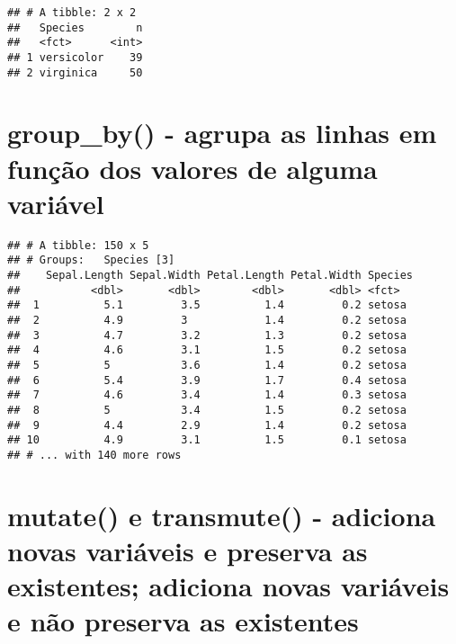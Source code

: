 \documentclass[]{book}
\newenvironment{Shaded}{\begin{snugshade}}{\end{snugshade}}
\newcommand{\CommentTok}[1]{\textcolor[rgb]{0.56,0.35,0.01}{\textit{#1}}}
\newcommand{\KeywordTok}[1]{\textcolor[rgb]{0.13,0.29,0.53}{\textbf{#1}}}
\newcommand{\NormalTok}[1]{#1}
\newcommand{\OperatorTok}[1]{\textcolor[rgb]{0.81,0.36,0.00}{\textbf{#1}}}
\newcommand{\StringTok}[1]{\textcolor[rgb]{0.31,0.60,0.02}{#1}}
\begin{document}
\begin{verbatim}
## # A tibble: 2 x 2
##   Species        n
##   <fct>      <int>
## 1 versicolor    39
## 2 virginica     50
\end{verbatim}

\hypertarget{group_by---agrupa-as-linhas-em-funuxe7uxe3o-dos-valores-de-alguma-variuxe1vel}{%
\section{group\_by() - agrupa as linhas em função dos valores de alguma variável}\label{group_by---agrupa-as-linhas-em-funuxe7uxe3o-dos-valores-de-alguma-variuxe1vel}}

\begin{Shaded}
\end{Shaded}

\begin{verbatim}
## # A tibble: 150 x 5
## # Groups:   Species [3]
##    Sepal.Length Sepal.Width Petal.Length Petal.Width Species
##           <dbl>       <dbl>        <dbl>       <dbl> <fct>  
##  1          5.1         3.5          1.4         0.2 setosa 
##  2          4.9         3            1.4         0.2 setosa 
##  3          4.7         3.2          1.3         0.2 setosa 
##  4          4.6         3.1          1.5         0.2 setosa 
##  5          5           3.6          1.4         0.2 setosa 
##  6          5.4         3.9          1.7         0.4 setosa 
##  7          4.6         3.4          1.4         0.3 setosa 
##  8          5           3.4          1.5         0.2 setosa 
##  9          4.4         2.9          1.4         0.2 setosa 
## 10          4.9         3.1          1.5         0.1 setosa 
## # ... with 140 more rows
\end{verbatim}

\hypertarget{mutate-e-transmute---adiciona-novas-variuxe1veis-e-preserva-as-existentes-adiciona-novas-variuxe1veis-e-nuxe3o-preserva-as-existentes}{%
\section{mutate() e transmute() - adiciona novas variáveis e preserva as existentes; adiciona novas variáveis e não preserva as existentes}\label{mutate-e-transmute---adiciona-novas-variuxe1veis-e-preserva-as-existentes-adiciona-novas-variuxe1veis-e-nuxe3o-preserva-as-existentes}}
\end{document}

